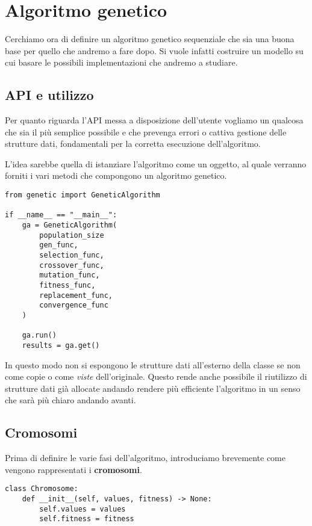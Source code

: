 \section{Algoritmo genetico}

Cerchiamo ora di definire un algoritmo genetico sequenziale che sia una buona
base per quello che andremo a fare dopo. Si vuole infatti costruire un modello
su cui basare le possibili implementazioni che andremo a studiare.

\subsection{API e utilizzo}

Per quanto riguarda l'API messa a disposizione dell'utente vogliamo un qualcosa
che sia il più semplice possibile e che prevenga errori o cattiva gestione
delle strutture dati, fondamentali per la corretta esecuzione dell'algoritmo.

L'idea sarebbe quella di istanziare l'algoritmo come un oggetto, al quale
verranno forniti i vari metodi che compongono un algoritmo genetico.

\begin{verbatim}
from genetic import GeneticAlgorithm

if __name__ == "__main__":
	ga = GeneticAlgorithm(
		population_size
		gen_func,
		selection_func,
		crossover_func,
		mutation_func,
		fitness_func,
		replacement_func,
		convergence_func
	)

	ga.run()
	results = ga.get()
\end{verbatim}

In questo modo non si espongono le strutture dati all'esterno della classe se
non come copie o come \emph{viste} dell'originale. Questo rende anche possibile
il riutilizzo di strutture dati già allocate andando rendere più efficiente
l'algoritmo in un senso che sarà più chiaro andando avanti.

\subsection{Cromosomi}

Prima di definire le varie fasi dell'algoritmo, introduciamo brevemente come
vengono rappresentati i \textbf{cromosomi}.

\begin{verbatim}
class Chromosome:
	def __init__(self, values, fitness) -> None:
		self.values = values
		self.fitness = fitness
\end{verbatim}

